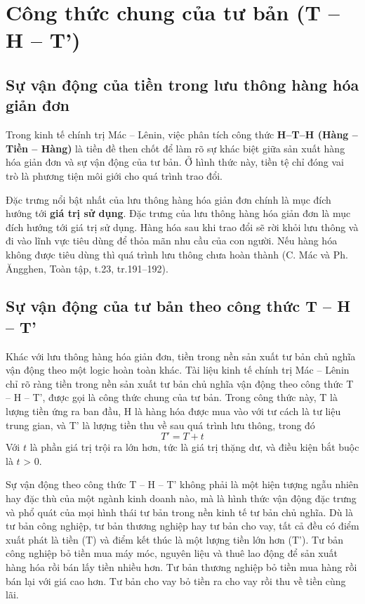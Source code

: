 \section{Công thức chung của tư bản (T – H – T')}
\subsection{Sự vận động của tiền trong lưu thông hàng hóa giản đơn}
Trong kinh tế chính trị Mác – Lênin, việc phân tích công thức \textbf{H–T–H (Hàng – Tiền – Hàng)} là tiền đề then chốt để làm rõ sự khác biệt giữa sản xuất hàng hóa giản đơn và sự vận động của tư bản. Ở hình thức này, tiền tệ chỉ đóng vai trò là phương tiện môi giới cho quá trình trao đổi.

Đặc trưng nổi bật nhất của lưu thông hàng hóa giản đơn chính là mục đích hướng tới \textbf{giá trị sử dụng}. Đặc trưng của lưu thông hàng hóa giản đơn là mục đích hướng tới giá trị sử dụng. Hàng hóa sau khi trao đổi sẽ rời khỏi lưu thông và đi vào lĩnh vực tiêu dùng để thỏa mãn nhu cầu của con người. Nếu hàng hóa không được tiêu dùng thì quá trình lưu thông chưa hoàn thành (C. Mác và Ph. Ăngghen, Toàn tập, t.23, tr.191–192).

\subsection{Sự vận động của tư bản theo công thức T – H – T'}
Khác với lưu thông hàng hóa giản đơn, tiền trong nền sản xuất tư bản chủ nghĩa vận động theo một logic hoàn toàn khác. Tài liệu kinh tế chính trị Mác – Lênin chỉ rõ ràng tiền trong nền sản xuất tư bản chủ nghĩa vận động theo công thức T – H – T', được gọi là công thức chung của tư bản. Trong công thức này, T là lượng tiền ứng ra ban đầu, H là hàng hóa được mua vào với tư cách là tư liệu trung gian, và T' là lượng tiền thu về sau quá trình lưu thông, trong đó
\[
    T' = T + t
\]
Với $t$ là phần giá trị trội ra lớn hơn, tức là giá trị thặng dư, và điều kiện bắt buộc là $t$ > 0.

Sự vận động theo công thức T – H – T' không phải là một hiện tượng ngẫu nhiên hay đặc thù của một ngành kinh doanh nào, mà là hình thức vận động đặc trưng và phổ quát của mọi hình thái tư bản trong nền kinh tế tư bản chủ nghĩa. Dù là tư bản công nghiệp, tư bản thương nghiệp hay tư bản cho vay, tất cả đều có điểm xuất phát là tiền (T) và điểm kết thúc là một lượng tiền lớn hơn (T'). Tư bản công nghiệp bỏ tiền mua máy móc, nguyên liệu và thuê lao động để sản xuất hàng hóa rồi bán lấy tiền nhiều hơn. Tư bản thương nghiệp bỏ tiền mua hàng rồi bán lại với giá cao hơn. Tư bản cho vay bỏ tiền ra cho vay rồi thu về tiền cùng lãi.


